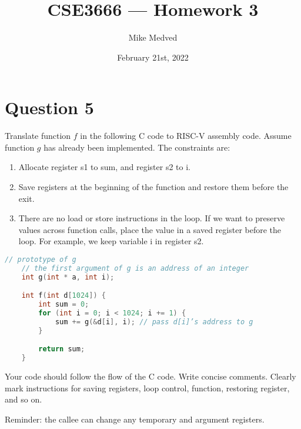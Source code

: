 \documentclass{article}
\title{CSE3666 — Homework 3}
\author{Mike Medved}
\date{February 21st, 2022}
\begin{document}
\maketitle

\section{Question 5}
Translate function $f$ in the following C code to RISC-V assembly code. Assume function $g$ has already been implemented. The constraints are:
\begin{enumerate}
    \item Allocate register s1 to sum, and register s2 to i.
    \item Save registers at the beginning of the function and restore them before the exit.
    \item There are no load or store instructions in the loop. If we want to preserve values across function calls, place the value in a saved register before the loop. For example, we keep variable i in register s2.
\end{enumerate}

\hfill
\begin{lstlisting}[language=C]
    // prototype of g
    // the first argument of g is an address of an integer
    int g(int * a, int i);

    int f(int d[1024]) {
        int sum = 0;
        for (int i = 0; i < 1024; i += 1) {
            sum += g(&d[i], i); // pass d[i]’s address to g
        }

        return sum;
    }
\end{lstlisting}

\hfill \break
Your code should follow the flow of the C code. Write concise comments. Clearly mark
instructions for saving registers, loop control, function, restoring register, and so on.

\hfill \break
Reminder: the callee can change any temporary and argument registers.

\break
\end{document}
